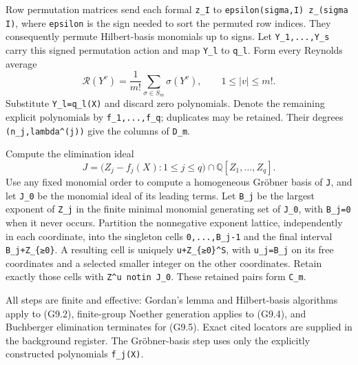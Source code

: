 \documentclass[
  10pt,
]{article}
\begin{document}
Row permutation matrices send each formal
\texttt{\small z\_\allowbreak{}I} to
\texttt{\small epsilon(\allowbreak{}sigma,\allowbreak{}I)\allowbreak{} z\_\allowbreak{}(\allowbreak{}sigma I)\allowbreak{}},
where \texttt{\small epsilon} is the sign needed to sort the permuted
row indices. They consequently permute Hilbert-basis monomials up to
signs. Let
\texttt{\small Y\_\allowbreak{}1,\allowbreak{}...,\allowbreak{}Y\_\allowbreak{}s}
carry this signed permutation action and map
\texttt{\small Y\_\allowbreak{}l} to \texttt{\small q\_\allowbreak{}l}.
Form every Reynolds average \[
\mathcal R(Y^v)=\frac1{m!}\sum_{\sigma\in S_m}\sigma(Y^v),
\qquad1\le|v|\le m!.
\tag{G9.4}
\] Substitute
\texttt{\small Y\_\allowbreak{}l=\allowbreak{}q\_\allowbreak{}l(\allowbreak{}X)\allowbreak{}}
and discard zero polynomials. Denote the remaining explicit polynomials
by
\texttt{\small f\_\allowbreak{}1,\allowbreak{}...,\allowbreak{}f\_\allowbreak{}q};
duplicates may be retained. Their degrees
\texttt{\small (\allowbreak{}n\_\allowbreak{}j,\allowbreak{}lambda\textasciicircum{}(\allowbreak{}j)\allowbreak{})\allowbreak{}}
give the columns of \texttt{\small D\_\allowbreak{}m}.

Compute the elimination ideal \[
J=\bigl(Z_j-f_j(X):1\le j\le q\bigr)
\cap\mathbb Q[Z_1,\ldots,Z_q].
\tag{G9.5}
\] Use any fixed monomial order to compute a homogeneous Gröbner basis
of \texttt{\small J}, and let \texttt{\small J\_\allowbreak{}0} be the
monomial ideal of its leading terms. Let
\texttt{\small B\_\allowbreak{}j} be the largest exponent of
\texttt{\small Z\_\allowbreak{}j} in the finite minimal monomial
generating set of \texttt{\small J\_\allowbreak{}0}, with
\texttt{\small B\_\allowbreak{}j=\allowbreak{}0} when it never occurs.
Partition the nonnegative exponent lattice, independently in each
coordinate, into the singleton cells
\texttt{\small 0,\allowbreak{}...,\allowbreak{}B\_\allowbreak{}j-\allowbreak{}1}
and the final interval
\texttt{\small B\_\allowbreak{}j+\allowbreak{}Z\_\allowbreak{}\{≥\allowbreak{}0\}}.
A resulting cell is uniquely
\texttt{\small u+\allowbreak{}Z\_\allowbreak{}\{≥\allowbreak{}0\}\textasciicircum{}S},
with \texttt{\small u\_\allowbreak{}j=\allowbreak{}B\_\allowbreak{}j} on
its free coordinates and a selected smaller integer on the other
coordinates. Retain exactly those cells with
\texttt{\small Z\textasciicircum{}u notin J\_\allowbreak{}0}. These
retained pairs form \texttt{\small C\_\allowbreak{}m}.

All steps are finite and effective: Gordan's lemma and Hilbert-basis
algorithms apply to (G9.2), finite-group Noether generation applies to
(G9.4), and Buchberger elimination terminates for (G9.5). Exact cited
locators are supplied in the background register. The Gröbner-basis step
uses only the explicitly constructed polynomials
\texttt{\small f\_\allowbreak{}j(\allowbreak{}X)\allowbreak{}}.
\end{document}
